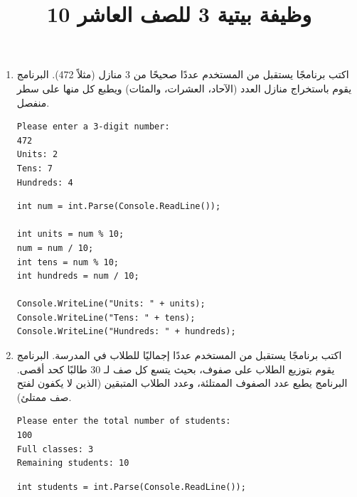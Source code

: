 \documentclass[14pt]{extarticle}
\title{وظيفة بيتية 3 للصف العاشر 10}
\begin{document}
\maketitle
\thispagestyle{fancy}

\begin{enumerate}[itemsep=3em]
    \item
    اكتب برنامجًا يستقبل من المستخدم عددًا صحيحًا من 3 منازل (مثلاً 472).
    البرنامج يقوم باستخراج منازل العدد (الآحاد، العشرات، والمئات) ويطبع كل منها على سطر منفصل.
    \ifdetailed
    \begin{boxExample}
    \begin{english}
    \begin{verbatim}
Please enter a 3-digit number:
472
Units: 2
Tens: 7
Hundreds: 4
    \end{verbatim}
    \end{english}
    \end{boxExample}
    \ifwithsols
    \begin{boxSolution}
    \begin{english}
    \begin{verbatim}
int num = int.Parse(Console.ReadLine());

int units = num % 10;
num = num / 10;
int tens = num % 10;
int hundreds = num / 10;

Console.WriteLine("Units: " + units);
Console.WriteLine("Tens: " + tens);
Console.WriteLine("Hundreds: " + hundreds);
    \end{verbatim}
    \end{english}
    \end{boxSolution}
    \clearpage
    \fi
    \fi

    \item
    اكتب برنامجًا يستقبل من المستخدم عددًا إجماليًا للطلاب في المدرسة.
    البرنامج يقوم بتوزيع الطلاب على صفوف، بحيث يتسع كل صف لـ $30$ طالبًا كحد أقصى.
    البرنامج يطبع عدد الصفوف الممتلئة، وعدد الطلاب المتبقين (الذين لا يكفون لفتح صف ممتلئ).
    \ifdetailed
    \begin{boxExample}
    \begin{english}
    \begin{verbatim}
Please enter the total number of students:
100
Full classes: 3
Remaining students: 10
    \end{verbatim}
    \end{english}
    \end{boxExample}
    \ifwithsols
    \begin{boxSolution}
    \begin{english}
    \begin{verbatim}
int students = int.Parse(Console.ReadLine());


\end{verbatim}
\end{english}
\end{boxSolution}
\end{enumerate}
\end{document}
